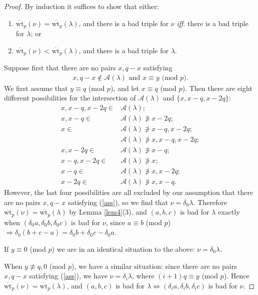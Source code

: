 \documentclass[10pt]{amsart}
\begin{document}
\begin{proof}
By induction it suffices to show that either:
\begin{enumerate}
\item  $\overline{\text{wt}}_p(\nu)=\overline{\text{wt}}_p(\lambda)$, and there is a bad triple for $\nu$ \textit{iff}. there is a bad triple for $\lambda$; or 
\item 
$\overline{\text{wt}}_p(\nu)<\overline{\text{wt}}_p(\lambda)$, and there is a bad triple for $\lambda$.
\end{enumerate}
Suppose first that there are no pairs $x,q-x$ satisfying 
\begin{align}\label{ass}x,q-x\not\in\mathcal{A}(\lambda)\text{ and }x\equiv y\text{ (mod }p\text{)}.\end{align} 
We first assume that $y\equiv q$ (mod $p$), and let $x\equiv q$ (mod $p$). Then there are eight different possibilities for the intersection of $\mathcal{A}(\lambda)$ and $\{x,x-q,x-2q\}$: 
\begin{align*}x,x-q,x-2q\in&\mathcal{A}(\lambda);\\
x,x-q\in&\mathcal{A}(\lambda)\not\ni x-2q;\\
x\in&\mathcal{A}(\lambda)\not\ni x-q,x-2q;\\
&\mathcal{A}(\lambda)\not\ni x,x-q,x-2q;\\
x,x-2q\in&\mathcal{A}(\lambda)\not\ni x-q;\\
x-q,x-2q\in&\mathcal{A}(\lambda)\not\ni x;\\
x-q\in&\mathcal{A}(\lambda)\not\ni x,x-2q;\\
x-2q\in&\mathcal{A}(\lambda)\not\ni x,x-q.\end{align*} 
However, the last four possibilities are all excluded by our assumption that there are no pairs $x,q-x$ satisfying (\ref{ass}), so we find that $\nu=\delta_0\lambda$. Therefore $\overline{\text{wt}}_p(\nu)=\overline{\text{wt}}_p(\lambda)$ by Lemma \ref{lem4}(3), and $(a,b,c)$ is bad for $\lambda$ exactly when $(\delta_0a,\delta_0b,\delta_0c)$ is bad for $\nu$, since $a\equiv b$ (mod $p$) $\Rightarrow \delta_0(b+c-a)=\delta_0b+\delta_0c-\delta_0a$.

If $y\equiv 0$ (mod $p$) we are in an identical situation to the above: $\nu=\delta_0\lambda$. 

When $y\not\equiv q,0$ (mod $p$), we have a similar situation: since there are no pairs $x,q-x$ satisfying (\ref{ass}), we have $\nu=\delta_i\lambda$, where $(i+1)q\equiv y$ (mod $p$). Hence $\overline{\text{wt}}_p(\nu)=\overline{\text{wt}}_p(\lambda)$, and $(a,b,c)$ is bad for $\lambda\Leftrightarrow (\delta_ia,\delta_ib,\delta_ic)$ is bad for $\nu$.


\end{proof}
\end{document}
